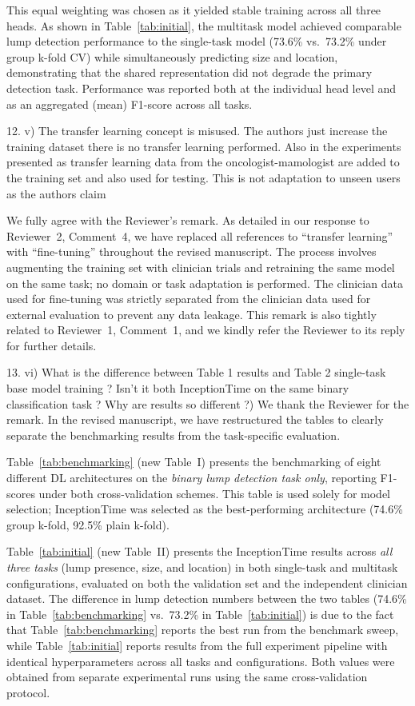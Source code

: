 \documentclass[a4paper, onecolumn]{IEEEtran}
\newcommand\blue[1]{{\textcolor{white!30!blue}{#1}}}
\begin{document}
This equal weighting was chosen as it yielded stable training across all three heads. As shown in Table~\ref{tab:initial}, the multitask model achieved comparable lump detection performance to the single-task model (73.6\% vs.\ 73.2\% under group k-fold CV) while simultaneously predicting size and location, demonstrating that the shared representation did not degrade the primary detection task. Performance was reported both at the individual head level and as an aggregated (mean) F1-score across all tasks.

\blue{12. v) The transfer learning concept is misused. The authors just increase the training dataset there is no transfer learning performed. Also in the experiments presented as transfer learning data from the oncologist-mamologist are added to the training set and also used for testing. This is not adaptation to unseen users as the authors claim}

We fully agree with the Reviewer's remark. As detailed in our response to Reviewer~2, Comment~4, we have replaced all references to ``transfer learning'' with ``fine-tuning'' throughout the revised manuscript. The process involves augmenting the training set with clinician trials and retraining the same model on the same task; no domain or task adaptation is performed. The clinician data used for fine-tuning was strictly separated from the clinician data used for external evaluation to prevent any data leakage. This remark is also tightly related to Reviewer~1, Comment~1, and we kindly refer the Reviewer to its reply for further details. 

\blue{13. vi) What is the difference between Table 1 results and Table 2 single-task base model training ? Isn't it both InceptionTime on the same binary classification task ? Why are results so different ?)}
We thank the Reviewer for the remark. In the revised manuscript, we have restructured the tables to clearly separate the benchmarking results from the task-specific evaluation.

Table~\ref{tab:benchmarking} (new Table~I) presents the benchmarking of eight different DL architectures on the \textit{binary lump detection task only}, reporting F1-scores under both cross-validation schemes. This table is used solely for model selection; InceptionTime was selected as the best-performing architecture (74.6\% group k-fold, 92.5\% plain k-fold).

Table~\ref{tab:initial} (new Table~II) presents the InceptionTime results across \textit{all three tasks} (lump presence, size, and location) in both single-task and multitask configurations, evaluated on both the validation set and the independent clinician dataset. The difference in lump detection numbers between the two tables (74.6\% in Table~\ref{tab:benchmarking} vs.\ 73.2\% in Table~\ref{tab:initial}) is due to the fact that Table~\ref{tab:benchmarking} reports the best run from the benchmark sweep, while Table~\ref{tab:initial} reports results from the full experiment pipeline with identical hyperparameters across all tasks and configurations. Both values were obtained from separate experimental runs using the same cross-validation protocol. 
\end{document}
